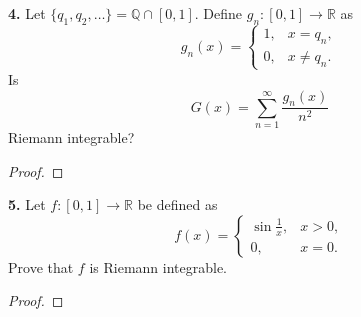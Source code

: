 \documentclass{article}
\newcommand{\R}{\mathbb{R}}
\newcommand{\Q}{\mathbb{Q}}
\newcommand{\problem}[1]{\noindent \textbf{#1}}
\begin{document}

\problem{4. }
Let $\{q_1, q_2, \dots\} = \Q \cap [0, 1]$. Define $g_n : [0, 1] \to \R$ as
$$g_n(x) = \begin{cases}
    1, & x = q_n, \\
    0, & x \ne q_n.
\end{cases}$$
Is
$$G(x) = \sum_{n = 1}^{\infty} \frac{g_n(x)}{n^2}$$
Riemann integrable?

\begin{proof}
    
\end{proof}


\problem{5. }
Let $f: [0, 1] \to \R$ be defined as
$$f(x) = \begin{cases}
    \sin \frac{1}{x}, & x > 0, \\
    0, & x = 0.
\end{cases}$$
Prove that $f$ is Riemann integrable.

\begin{proof}
    
\end{proof}


\end{document}
